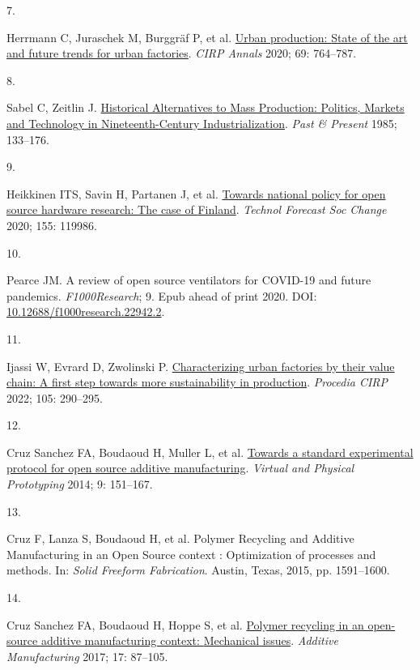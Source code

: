 \documentclass[
  11pt,
  a4paperpaper,
  onecolumn]{article}
\newlength{\cslhangindent}
\newlength{\csllabelwidth}
\newlength{\cslentryspacingunit} %
\newenvironment{CSLReferences}[2] %
 {%
  \setlength{\parindent}{0pt}
  \ifodd #1
  \let\oldpar\par
  \def\par{\hangindent=\cslhangindent\oldpar}
  \fi
  \setlength{\parskip}{#2\cslentryspacingunit}
 }%
 {}
\newcommand{\CSLLeftMargin}[1]{\parbox[t]{\csllabelwidth}{#1}}
\newcommand{\CSLRightInline}[1]{\parbox[t]{\linewidth - \csllabelwidth}{#1}\break}
\begin{document}
\begin{CSLReferences}{0}{0}
\leavevmode{}%
\CSLLeftMargin{7. }%
\CSLRightInline{Herrmann C, Juraschek M, Burggräf P, et al.
\href{https://doi.org/10.1016/j.cirp.2020.05.003}{Urban production:
{State} of the art and future trends for urban factories}. \emph{CIRP
Annals} 2020; 69: 764--787.}

\leavevmode{}%
\CSLLeftMargin{8. }%
\CSLRightInline{Sabel C, Zeitlin J.
\href{https://www.jstor.org/stable/650576}{Historical {Alternatives} to
{Mass Production}: {Politics}, {Markets} and {Technology} in
{Nineteenth-Century Industrialization}}. \emph{Past \& Present} 1985;
133--176.}

\leavevmode{}%
\CSLLeftMargin{9. }%
\CSLRightInline{Heikkinen ITS, Savin H, Partanen J, et al.
\href{https://doi.org/10.1016/j.techfore.2020.119986}{Towards national
policy for open source hardware research: {The} case of {Finland}}.
\emph{Technol Forecast Soc Change} 2020; 155: 119986.}

\leavevmode{}%
\CSLLeftMargin{10. }%
\CSLRightInline{Pearce JM. A review of open source ventilators for
{COVID-19} and future pandemics. \emph{F1000Research}; 9. Epub ahead of
print 2020. DOI:
\href{https://doi.org/10.12688/f1000research.22942.2}{10.12688/f1000research.22942.2}.}

\leavevmode{}%
\CSLLeftMargin{11. }%
\CSLRightInline{Ijassi W, Evrard D, Zwolinski P.
\href{https://doi.org/10.1016/j.procir.2022.02.048}{Characterizing urban
factories by their value chain: A first step towards more sustainability
in production}. \emph{Procedia CIRP} 2022; 105: 290--295.}

\leavevmode{}%
\CSLLeftMargin{12. }%
\CSLRightInline{Cruz Sanchez FA, Boudaoud H, Muller L, et al.
\href{https://doi.org/10.1080/17452759.2014.919553}{Towards a standard
experimental protocol for open source additive manufacturing}.
\emph{Virtual and Physical Prototyping} 2014; 9: 151--167.}

\leavevmode{}%
\CSLLeftMargin{13. }%
\CSLRightInline{Cruz F, Lanza S, Boudaoud H, et al. Polymer {Recycling}
and {Additive Manufacturing} in an {Open Source} context :
{Optimization} of processes and methods. In: \emph{Solid {Freeform
Fabrication}}. {Austin, Texas}, 2015, pp. 1591--1600.}

\leavevmode{}%
\CSLLeftMargin{14. }%
\CSLRightInline{Cruz Sanchez FA, Boudaoud H, Hoppe S, et al.
\href{https://doi.org/10.1016/j.addma.2017.05.013}{Polymer recycling in
an open-source additive manufacturing context: {Mechanical} issues}.
\emph{Additive Manufacturing} 2017; 17: 87--105.}


\end{CSLReferences}
\end{document}
